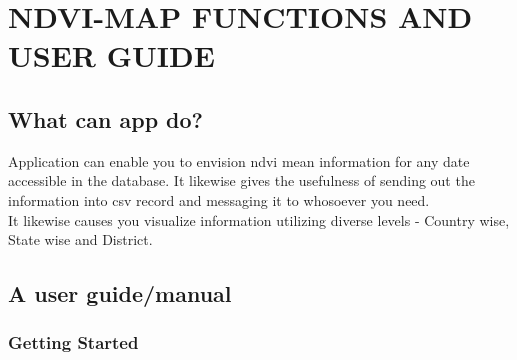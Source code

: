 \chapter{NDVI-MAP FUNCTIONS AND USER GUIDE}
\label{chap:ndvi & it's user guide}

\section{What can app do?}

Application can enable you to envision \gls{ndvi} mean information for any date accessible in the database. It likewise gives the usefulness of sending out the information into \gls{csv} record and messaging it to whosoever you need. \\
It likewise causes you visualize information utilizing diverse levels - Country wise, State wise and District.

\section{A user guide/manual}

\subsection{Getting Started}

